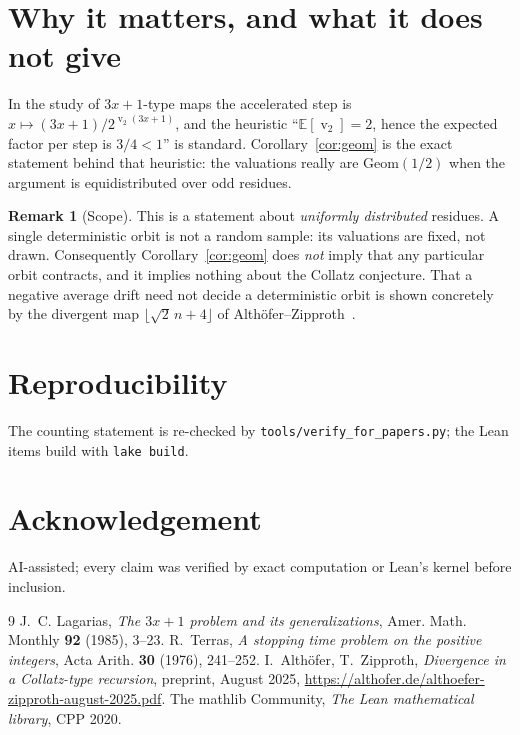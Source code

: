 \documentclass[11pt,a4paper]{article}
\theoremstyle{plain}
\theoremstyle{definition}
\newtheorem{remark}[theorem]{Remark}
\newcommand{\val}{\operatorname{v}_2}
\begin{document}
\section{Why it matters, and what it does not give}
In the study of $3x+1$-type maps the accelerated step is
$x\mapsto(3x+1)/2^{\val(3x+1)}$, and the heuristic ``$\mathbb{E}[\val]=2$, hence the expected
factor per step is $3/4<1$'' is standard. Corollary~\ref{cor:geom} is the exact statement
behind that heuristic: the valuations really are $\mathrm{Geom}(1/2)$ when the argument is
equidistributed over odd residues.

\begin{remark}[Scope]
This is a statement about \emph{uniformly distributed} residues. A single deterministic orbit
is not a random sample: its valuations are fixed, not drawn. Consequently
Corollary~\ref{cor:geom} does \emph{not} imply that any particular orbit contracts, and it
implies nothing about the Collatz conjecture. That a negative average drift need not decide a
deterministic orbit is shown concretely by the divergent map $\lfloor\sqrt2\,n+4\rfloor$ of
Alth\"ofer--Zipproth~\cite{az}.
\end{remark}

\section*{Reproducibility}
The counting statement is re-checked by \texttt{tools/verify\_for\_papers.py}; the Lean items
build with \texttt{lake build}.

\section*{Acknowledgement}
AI-assisted; every claim was verified by exact computation or Lean's kernel before inclusion.

\begin{thebibliography}{9}
 J.~C. Lagarias, \emph{The $3x+1$ problem and its generalizations},
Amer. Math. Monthly \textbf{92} (1985), 3--23.
 R.~Terras, \emph{A stopping time problem on the positive integers},
Acta Arith. \textbf{30} (1976), 241--252.
 I.~Alth\"ofer, T.~Zipproth, \emph{Divergence in a Collatz-type recursion},
preprint, August 2025, \url{https://althofer.de/althoefer-zipproth-august-2025.pdf}.
 The mathlib Community, \emph{The Lean mathematical library}, CPP 2020.
\end{thebibliography}
\end{document}

